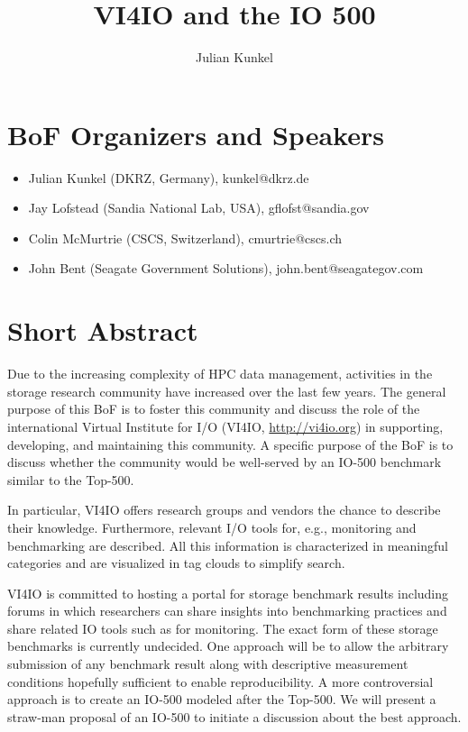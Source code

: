 \documentclass[a4paper,10pt]{article}
\title{VI4IO and the IO 500}
\author{Julian Kunkel}
\begin{document}
\maketitle

\section{BoF Organizers and Speakers}
\begin{itemize}
  \item Julian Kunkel (DKRZ, Germany), kunkel@dkrz.de
  \item Jay Lofstead (Sandia National Lab, USA), gflofst@sandia.gov
  \item Colin McMurtrie (CSCS, Switzerland), cmurtrie@cscs.ch
  \item John Bent (Seagate Government Solutions), john.bent@seagategov.com 
\end{itemize}


\section{Short Abstract}  %
Due to the increasing complexity of HPC data management, activities in the storage research community 
have increased over the last few years.  The general purpose of this BoF is to foster this community and discuss 
the role of the international Virtual Institute for I/O (VI4IO, \url{http://vi4io.org}) in supporting, developing, and maintaining this community.  
A specific purpose of the BoF is
to discuss whether the community would be well-served by an IO-500 benchmark similar to the Top-500. 


In particular, 
VI4IO offers research groups and vendors the chance to describe their knowledge.
Furthermore, relevant I/O tools for, e.g., monitoring and benchmarking are described.
All this information is characterized in meaningful categories and are visualized in tag clouds to simplify search.
\fi

VI4IO is committed to hosting a portal for storage benchmark results including
forums in which researchers can share insights into benchmarking practices
and share related IO tools such as for monitoring.  The exact form of these
storage benchmarks is currently undecided.  One approach will be to allow the
arbitrary submission of any benchmark result along with descriptive measurement
conditions hopefully sufficient to enable reproducibility.  A more controversial approach is to
create an IO-500 modeled after the Top-500.  
We will present a straw-man proposal of an IO-500 to initiate a discussion about the best approach.
\end{document}
